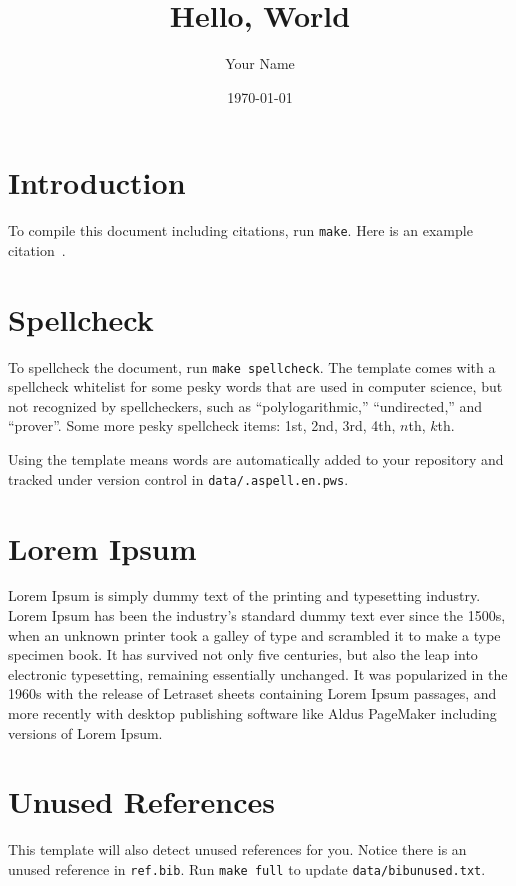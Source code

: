 \documentclass{article}
\title{Hello, World}
\author{Your Name}
\date{\today{}}
\begin{document}
\maketitle

\section{Introduction}

To compile this document including citations, run \texttt{make}.
Here is an example citation~\cite{knuth1997art}.

\section{Spellcheck}

To spellcheck the document, run \texttt{make spellcheck}.
The template comes with a spellcheck whitelist for some pesky words that
are used in computer science, but not recognized by spellcheckers, such as
``polylogarithmic,'' ``undirected,'' and ``prover''.
Some more pesky spellcheck items:
1st, 2nd, 3rd, 4th, $n$th, $k$th.

Using the template means words are automatically added to your repository and
tracked under version control in \texttt{data/.aspell.en.pws}.

\section{Lorem Ipsum}

Lorem Ipsum is simply dummy text of the printing and typesetting industry. Lorem Ipsum has been the industry's standard dummy text ever since the 1500s, when an unknown printer took a galley of type and scrambled it to make a type specimen book. It has survived not only five centuries, but also the leap into electronic typesetting, remaining essentially unchanged. It was popularized in the 1960s with the release of Letraset sheets containing Lorem Ipsum passages, and more recently with desktop publishing software like Aldus PageMaker including versions of Lorem Ipsum.

\section{Unused References}

This template will also detect unused references for you.
Notice there is an unused reference in \texttt{ref.bib}.
Run \texttt{make full} to update \texttt{data/bibunused.txt}.



\end{document}
